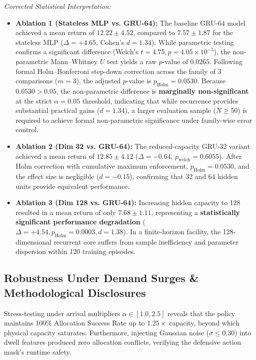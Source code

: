 \documentclass[journal]{IEEEtran}
\begin{document}
\textit{Corrected Statistical Interpretation:}
\begin{itemize}
    \item \textbf{Ablation 1 (Stateless MLP vs. GRU-64):} The baseline GRU-64 model achieved a mean return of $12.22 \pm 4.52$, compared to $7.57 \pm 1.87$ for the stateless MLP ($\Delta = +4.65$, Cohen's $d = 1.34$). While parametric testing confirms a significant difference (Welch's $t = 4.75, p = 4.05 \times 10^{-5}$), the non-parametric Mann--Whitney $U$ test yields a raw $p$-value of $0.0265$. Following formal Holm--Bonferroni step-down correction across the family of 3 comparisons ($m=3$), the adjusted $p$-value is $p_{\text{Holm}} = 0.0530$. Because $0.0530 > 0.05$, the non-parametric difference is \textbf{marginally non-significant} at the strict $\alpha = 0.05$ threshold, indicating that while recurrence provides substantial practical gains ($d=1.34$), a larger evaluation sample ($N \ge 50$) is required to achieve formal non-parametric significance under family-wise error control.
    \item \textbf{Ablation 2 (Dim 32 vs. GRU-64):} The reduced-capacity GRU-32 variant achieved a mean return of $12.85 \pm 4.12$ ($\Delta = -0.64$, $p_{\text{welch}} = 0.6055$). After Holm correction with cumulative maximum enforcement, $p_{\text{Holm}} = 0.0530$, and the effect size is negligible ($d = -0.15$), confirming that 32 and 64 hidden units provide equivalent performance.
    \item \textbf{Ablation 3 (Dim 128 vs. GRU-64):} Increasing hidden capacity to 128 resulted in a mean return of only $7.68 \pm 1.11$, representing a \textbf{statistically significant performance degradation} ($\Delta = +4.54, p_{\text{Holm}} = 0.0003, d = 1.38$). In a finite-horizon facility, the 128-dimensional recurrent core suffers from sample inefficiency and parameter dispersion within 120 training episodes.
\end{itemize}

\subsection{Robustness Under Demand Surges \& Methodological Disclosures}
Stress-testing under arrival multipliers $\alpha \in [1.0, 2.5]$ reveals that the policy maintains 100\% Allocation Success Rate up to $1.25\times$ capacity, beyond which physical capacity saturates. Furthermore, injecting Gaussian noise ($\sigma \le 0.30$) into dwell features produced zero allocation conflicts, verifying the defensive action mask's runtime safety.
\end{document}
